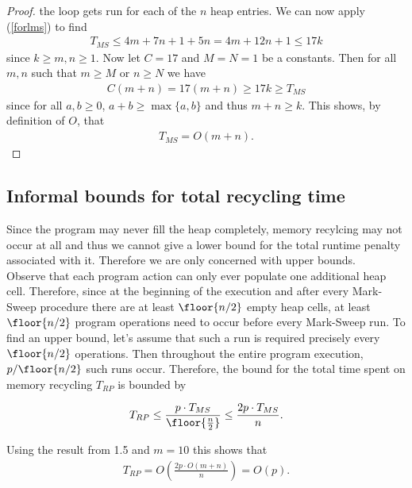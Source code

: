 \documentclass{article}
\begin{document}
\begin{proof}
    the loop gets run for each of the $n$ heap entries. We can now apply (\ref{forlms})
    to find
    \begin{align}
        \label{tmsbound}
        T_{MS} \leq 4m + 7n + 1 + 5n = 4m + 12n + 1 \leq 17k
    \end{align}
    since $k\geq m,n \geq 1$. Now let $C=17$ and $M=N=1$ be a constants. 
    Then for all $m,n$ such that $m\geq M$ or $n\geq N$ we have
    \begin{align*}
        C(m+n) = 17(m+n) \geq 17k \geq T_{MS}
    \end{align*}
    since for all $a,b\geq 0$, $a+b \geq \max\{a,b\}$ and thus $m+n\geq k$.
    This shows, by definition of $O$, that
    \begin{align*}
        T_{MS} = O(m+n).
    \end{align*}
\end{proof}

\subsection{Informal bounds for total recycling time}

Since the program may never fill the heap completely, memory recylcing may not occur
at all and thus we cannot give a lower bound for the total runtime penalty associated
with it. Therefore we are only concerned with upper bounds.\\
Observe that each program action can only ever populate one additional heap cell.
Therefore, since at the beginning of the execution and after every Mark-Sweep
procedure there are at least $\floor{n/2}$ empty heap cells, at least $\floor{n/2}$ program operations
need to occur before every Mark-Sweep run. To find an upper bound, let's assume that
such a run is required precisely every $\floor{n/2}$ operations. Then throughout the
entire program execution, $p/\floor{n/2}$ such runs occur. Therefore, the bound
for the total time spent on memory recycling $T_{RP}$ is bounded by 

\begin{align*}
    T_{RP} \leq \frac{p\cdot T_{MS}}{\floor{\frac{n}{2}}} \leq \frac{2p\cdot T_{MS}}{n}.
\end{align*}

Using the result from 1.5 and $m=10$ this shows that
\begin{align*}
    T_{RP} = O\left(\frac{2p\cdot O(m+n)}{n}\right) = O(p).
\end{align*}
\end{document}
